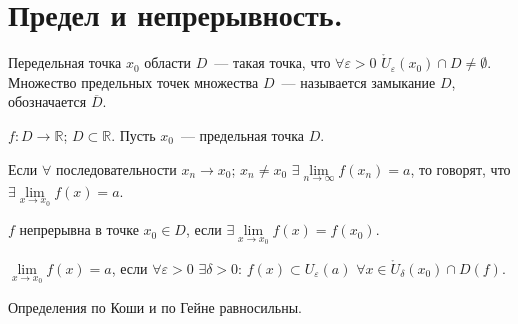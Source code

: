 \documentclass{article}
\begin{document}
	\section{Предел и непрерывность.}
	\begin{definition}
		Передельная точка $x_0$ области $D$~--- такая точка, что $\forall \varepsilon > 0$ $\mathring{U}_{\varepsilon}(x_0) \cap D \not= \emptyset$. Множество предельных точек множества $D$~--- называется замыкание $D$, обозначается $\overline{D}$.
	\end{definition}
	\noindent
	$f: D \rightarrow \mathbb{R}$; $D \subset \mathbb{R}$. Пусть $x_0$~--- предельная точка $D$. \\
	\begin{definition}[По Гейне]
		Если $\forall$ последовательности $x_n \rightarrow x_0$; $x_n \not= x_0$ $\exists \lim \limits_{n \rightarrow \infty} f(x_n) = a$, то говорят, что $\exists \lim \limits_{x \rightarrow x_0} f(x) = a$.
	\end{definition}
	\begin{definition}
		$f$ непрерывна в точке $x_0 \in D$, если $\exists \lim \limits_{x \rightarrow x_0} f(x) = f(x_0)$.
	\end{definition}
	\begin{definition}[ПО Коши]
		$\lim \limits_{x \rightarrow x_0} f(x) = a$, если $\forall \varepsilon > 0$ $\exists \delta > 0$: $f(x) \subset U_{\varepsilon}(a)$ $\forall x \in \mathring{U}_{\delta}(x_0) \cap D(f)$.
	\end{definition}
	\begin{statement}
		Определения по Коши и по Гейне равносильны.
	\end{statement}
\end{document}
